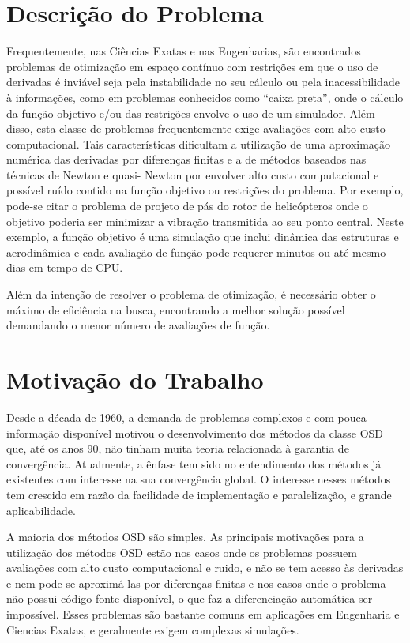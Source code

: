 \documentclass[a4paper,12pt]{monografia}
\theoremstyle{plain}
\theoremstyle{definition}
\theoremstyle{remark}
\begin{document}
\section{Descrição do Problema}%
Frequentemente,  nas Ciências Exatas e nas Engenharias,  são encontrados problemas de
otimização em espaço contínuo com restrições em que o uso de derivadas é inviável seja
pela instabilidade no seu cálculo ou pela inacessibilidade à informações, como em problemas conhecidos
como “caixa preta”,  onde o cálculo da função objetivo e/ou das restrições envolve o uso de
um  simulador.   Além  disso,  esta  classe  de  problemas  frequentemente exige avaliações  com
alto custo computacional. Tais características dificultam a utilização de uma aproximação numérica
das derivadas por diferenças finitas e a de métodos baseados nas técnicas de Newton e quasi-
Newton por envolver alto custo computacional e possível ruído contido na função objetivo ou
restrições do problema. Por exemplo, pode-se citar o problema de projeto de pás do rotor de helicópteros onde o objetivo poderia ser
minimizar a vibração transmitida ao seu ponto central. Neste exemplo, a função objetivo é uma simulação que inclui dinâmica das estruturas e aerodinâmica e cada avaliação de função pode requerer minutos ou até mesmo dias em tempo de CPU.

Além da intenção de resolver o problema de otimização, é necessário obter o máximo de eficiência na busca, encontrando a melhor solução possível demandando o menor número de avaliações de função.

\section{Motivação do Trabalho} %
Desde a década de 1960, a demanda de problemas complexos e com pouca informação disponível motivou o desenvolvimento dos métodos
da classe OSD que, até os anos 90, não tinham muita teoria relacionada à garantia de convergência. Atualmente, a ênfase tem sido no entendimento dos métodos já existentes com interesse na sua convergência global. O interesse nesses métodos tem crescido em razão da facilidade de implementação e paralelização, e grande aplicabilidade.

A maioria dos métodos OSD são simples. As principais motivações para a utilização dos métodos OSD estão nos casos onde os problemas possuem avaliações com alto custo computacional e ruido, e não se tem acesso às derivadas e nem pode-se aproximá-las por diferenças finitas e nos casos onde o problema não possui código fonte disponível, o que faz a diferenciação automática ser impossível. Esses problemas são bastante comuns em aplicações em Engenharia e Ciencias Exatas, e geralmente exigem complexas simulações.
\end{document}
